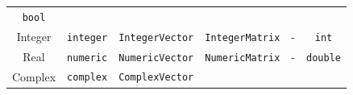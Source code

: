 \documentclass[
]{book}
\begin{document}
\begin{longtable}[]{@{}cccccc@{}}
\begin{minipage}[t]{0.14\columnwidth}
\texttt{bool}\strut
\end{minipage}\tabularnewline
\begin{minipage}[t]{0.14\columnwidth}\centering
Integer\strut
\end{minipage} & \begin{minipage}[t]{0.14\columnwidth}\centering
\texttt{integer}\strut
\end{minipage} & \begin{minipage}[t]{0.14\columnwidth}\centering
\texttt{IntegerVector}\strut
\end{minipage} & \begin{minipage}[t]{0.14\columnwidth}\centering
\texttt{IntegerMatrix}\strut
\end{minipage} & \begin{minipage}[t]{0.14\columnwidth}\centering
-\strut
\end{minipage} & \begin{minipage}[t]{0.14\columnwidth}\centering
\texttt{int}\strut
\end{minipage}\tabularnewline
\begin{minipage}[t]{0.14\columnwidth}\centering
Real\strut
\end{minipage} & \begin{minipage}[t]{0.14\columnwidth}\centering
\texttt{numeric}\strut
\end{minipage} & \begin{minipage}[t]{0.14\columnwidth}\centering
\texttt{NumericVector}\strut
\end{minipage} & \begin{minipage}[t]{0.14\columnwidth}\centering
\texttt{NumericMatrix}\strut
\end{minipage} & \begin{minipage}[t]{0.14\columnwidth}\centering
-\strut
\end{minipage} & \begin{minipage}[t]{0.14\columnwidth}\centering
\texttt{double}\strut
\end{minipage}\tabularnewline
\begin{minipage}[t]{0.14\columnwidth}\centering
Complex\strut
\end{minipage} & \begin{minipage}[t]{0.14\columnwidth}\centering
\texttt{complex}\strut
\end{minipage} & \begin{minipage}[t]{0.14\columnwidth}\centering
\texttt{ComplexVector}\strut
\end{minipage} & \begin{minipage}[t]{0.14\columnwidth}\centering

\end{minipage}
\end{longtable}
\end{document}
